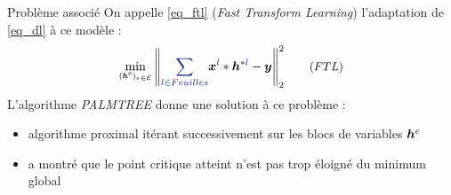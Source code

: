 \begin{frame}{Problème associé}
On appelle \eqref{eq_ftl} (\emph{Fast Transform Learning}) l'adaptation de \eqref{eq_dl} à ce modèle :
\begin{equation*} {\small
\underset{\substack{(\h^\text{e})_{e \in \E}}}\min
	\norm{\Beq{\sum_{l \in Feuilles}} \x^{\Beq{l}} * \h^{*\Beq{l}} -\y}{2}^2 \tag{${FTL}$} \label{eq_ftl}
    }
\end{equation*}
L'algorithme \emph{PALMTREE} donne une solution à ce problème :
\begin{itemize}
	\item algorithme proximal itérant successivement sur les blocs de variables $\bm{h}^e$
	\item \cite{chabiron_optimization_2016} a montré que le point  critique atteint n'est pas trop éloigné du minimum global
\end{itemize}
\end{frame}


